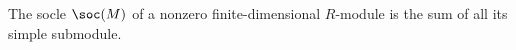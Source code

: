 The socle $\soc(M)$ of a nonzero finite-dimensional $R$-module is the sum of
all its simple submodule.
